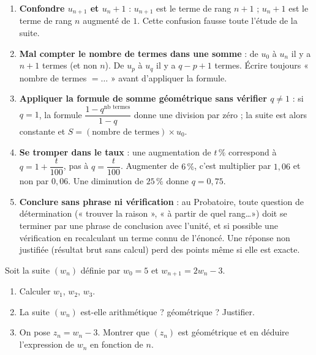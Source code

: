 \documentclass[11pt]{article}
\newcounter{popsec}
\newcounter{popsub}
\newcommand{\courssub}[1]{%
  \stepcounter{popsub}%
  \par\vspace{9pt}\noindent{\popxbold\fontsize{11.5}{13}\selectfont\color{popink}{\color{poporange}\thepopsec.\thepopsub}\hspace{6pt}#1}\par\nopagebreak\vspace{4pt}
}
\begin{document}
\begin{attention}
\begin{enumerate}
\item \textbf{Confondre $u_{n+1}$ et $u_n+1$} : $u_{n+1}$ est le terme de rang $n+1$ ; $u_n+1$ est le terme de rang $n$ augmenté de $1$. Cette confusion fausse toute l'étude de la suite.
\item \textbf{Mal compter le nombre de termes dans une somme} : de $u_0$ à $u_n$ il y a $n+1$ termes (et non $n$). De $u_p$ à $u_q$ il y a $q-p+1$ termes. Écrire toujours « nombre de termes $=\ldots$ » avant d'appliquer la formule.
\item \textbf{Appliquer la formule de somme géométrique sans vérifier $q\neq 1$} : si $q=1$, la formule $\dfrac{1-q^{\text{nb termes}}}{1-q}$ donne une division par zéro ; la suite est alors constante et $S=(\text{nombre de termes})\times u_0$.
\item \textbf{Se tromper dans le taux} : une augmentation de $t\,\%$ correspond à $q=1+\dfrac{t}{100}$, pas à $q=\dfrac{t}{100}$. Augmenter de $6\,\%$, c'est multiplier par $1,06$ et non par $0,06$. Une diminution de $25\,\%$ donne $q=0,75$.
\item \textbf{Conclure sans phrase ni vérification} : au Probatoire, toute question de détermination (« trouver la raison », « à partir de quel rang\ldots ») doit se terminer par une phrase de conclusion avec l'unité, et si possible une vérification en recalculant un terme connu de l'énoncé. Une réponse non justifiée (résultat brut sans calcul) perd des points même si elle est exacte.
\end{enumerate}
\end{attention}

\courssub{Exercices d'entraînement}

\begin{exercice}
Soit la suite $(w_n)$ définie par $w_0 = 5$ et $w_{n+1} = 2w_n - 3$.
\begin{enumerate}
\item Calculer $w_1$, $w_2$, $w_3$.
\item La suite $(w_n)$ est-elle arithmétique ? géométrique ? Justifier.
\item On pose $z_n = w_n - 3$. Montrer que $(z_n)$ est géométrique et en déduire l'expression de $w_n$ en fonction de $n$.
\end{enumerate}
\end{exercice}
\end{document}
